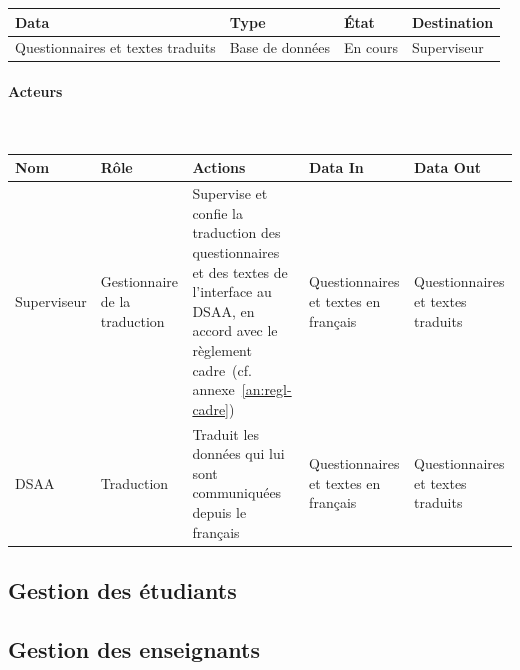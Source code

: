 \documentclass[a4paper,11pt]{report}
\begin{document}
\begin{tabularx}{\linewidth}{|X|X|X|X|} \hline
Data & Type & État & Destination \\ \hline
Questionnaires et textes traduits & Base de données & En cours & Superviseur \\ \hline
\end{tabularx}

\paragraph{Acteurs}~\newline{}

\begin{tabularx}{\linewidth}{|X|X|X|X|X|} \hline
Nom & Rôle & Actions & Data In & Data Out \\ \hline 
Superviseur & Gestionnaire de la traduction & Supervise et confie la traduction des questionnaires et des textes de l'interface au DSAA, en accord avec le règlement cadre~(cf. annexe~\ref{an:regl-cadre}) & Questionnaires et textes en français & Questionnaires et textes traduits \\ 
DSAA & Traduction & Traduit les données qui lui sont communiquées depuis le français & Questionnaires et textes en français & Questionnaires et textes traduits \\ \hline
\end{tabularx}





\subsection{Gestion des étudiants}




\subsection{Gestion des enseignants}




\end{document}
